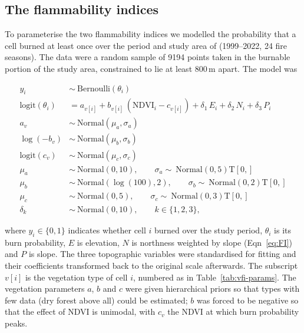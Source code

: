\documentclass[11pt,a4paper]{article}
\begin{document}
\subsection{The flammability indices}

To parameterise the two flammability indices we modelled the probability that a
cell burned at least once over the period and study area of
\citet{barbera_patterns} (1999--2022, 24 fire seasons). The data were a random
sample of 9194 points taken in the burnable portion of the study area,
constrained to lie at least 800\,m apart. The model was

\begin{equation}
\label{eq:fimodel}
\begin{aligned}
    y_i &\sim \ \text{Bernoulli}(\theta_i) \\
    \text{logit}(\theta_i) &= a_{v[i]} + b_{v[i]} \, (\mathrm{NDVI}_i - c_{v[i]})
        + \delta_1 \, E_i + \delta_2 \, N_i + \delta_3 \, P_i \\[4pt]
    a_v &\sim \ \text{Normal}(\mu_a, \sigma_a) \\
    \log(-b_v) &\sim \ \text{Normal}(\mu_b, \sigma_b) \\
    \text{logit}(c_v) &\sim \ \text{Normal}(\mu_c, \sigma_c) \\[4pt]
    \mu_a &\sim \ \text{Normal}(0, 10), \qquad
    \sigma_a \sim \ \text{Normal}(0, 5)\text{T}[0, ] \\
    \mu_b &\sim \ \text{Normal}(\log(100), 2), \qquad
    \sigma_b \sim \ \text{Normal}(0, 2)\text{T}[0, ] \\
    \mu_c &\sim \ \text{Normal}(0, 5), \qquad
    \sigma_c \sim \ \text{Normal}(0, 3)\text{T}[0, ] \\[4pt]
    \delta_k &\sim \ \text{Normal}(0, 10), \qquad k \in \{1, 2, 3\},
\end{aligned}
\end{equation}

\noindent where $y_i \in \{0, 1\}$ indicates whether cell $i$ burned over the
study period, $\theta_i$ is its burn probability, $E$ is elevation, $N$ is
northness weighted by slope (Eqn~\ref{eq:FI}) and $P$ is slope. The three
topographic variables were standardised for fitting and their coefficients
transformed back to the original scale afterwards. The subscript $v[i]$ is the
vegetation type of cell $i$, numbered as in Table~\ref{tab:vfi-params}. The
vegetation parameters $a$, $b$ and $c$ were given hierarchical priors so that
types with few data (dry forest above all) could be estimated; $b$ was
forced to be negative so that the effect of NDVI is unimodal, with $c_v$ the
NDVI at which burn probability peaks.
\end{document}
